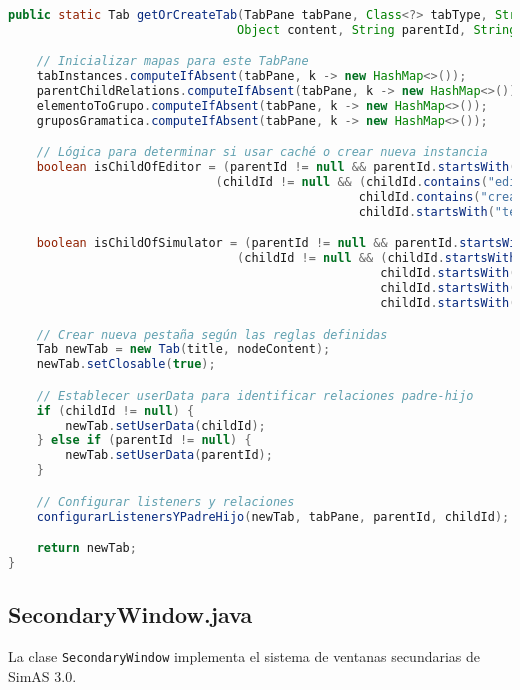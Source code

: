 \begin{lstlisting}[language=Java, caption=Método principal getOrCreateTab]
public static Tab getOrCreateTab(TabPane tabPane, Class<?> tabType, String title,
                                Object content, String parentId, String childId) {

    // Inicializar mapas para este TabPane
    tabInstances.computeIfAbsent(tabPane, k -> new HashMap<>());
    parentChildRelations.computeIfAbsent(tabPane, k -> new HashMap<>());
    elementoToGrupo.computeIfAbsent(tabPane, k -> new HashMap<>());
    gruposGramatica.computeIfAbsent(tabPane, k -> new HashMap<>());

    // Lógica para determinar si usar caché o crear nueva instancia
    boolean isChildOfEditor = (parentId != null && parentId.startsWith("editor_")) ||
                             (childId != null && (childId.contains("editor_") ||
                                                 childId.contains("creacion_") ||
                                                 childId.startsWith("terminales_")));

    boolean isChildOfSimulator = (parentId != null && parentId.startsWith("simulador_")) ||
                                (childId != null && (childId.startsWith("gramatica_simulador_") ||
                                                    childId.startsWith("funciones_error_simulador_") ||
                                                    childId.startsWith("derivacion_") ||
                                                    childId.startsWith("arbol_")));

    // Crear nueva pestaña según las reglas definidas
    Tab newTab = new Tab(title, nodeContent);
    newTab.setClosable(true);

    // Establecer userData para identificar relaciones padre-hijo
    if (childId != null) {
        newTab.setUserData(childId);
    } else if (parentId != null) {
        newTab.setUserData(parentId);
    }

    // Configurar listeners y relaciones
    configurarListenersYPadreHijo(newTab, tabPane, parentId, childId);

    return newTab;
}
\end{lstlisting}

\subsection{SecondaryWindow.java}

La clase \texttt{SecondaryWindow} implementa el sistema de ventanas secundarias de SimAS 3.0.

